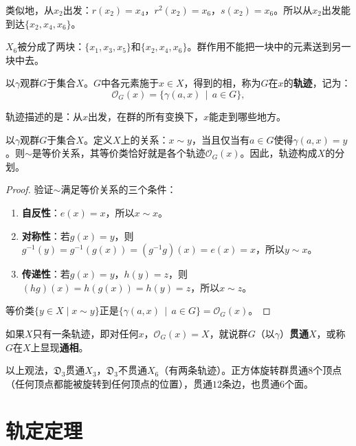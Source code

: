 \documentclass[12pt,UTF8,fontset=none]{ctexbook}
\begin{document}
类似地，从$x_2$出发：$r(x_2) = x_4$，$r^2(x_2) = x_6$，$s(x_2) = x_6$。所以从$x_2$出发能到达$\{x_2, x_4, x_6\}$。

$X_6$被分成了两块：$\{x_1, x_3, x_5\}$和$\{x_2, x_4, x_6\}$。群作用不能把一块中的元素送到另一块中去。


\begin{df}
以$\gamma$观群$G$于集合$X$。$G$中各元素施于$x\in X$，得到的相，称为$G$在$x$的\textbf{轨迹}，记为：
\[
\mathcal{O}_G(x) = \{\gamma(a,x) \,\mid \,a \in G\},
\]
\end{df}

轨迹描述的是：从$x$出发，在群的所有变换下，$x$能走到哪些地方。

\begin{pp}
以$\gamma$观群$G$于集合$X$。定义$X$上的关系：$x \sim y$，当且仅当有$a\in G$使得$\gamma(a,x) = y$。则$\sim$是等价关系，其等价类恰好就是各个轨迹$\mathcal{O}_G(x)$。因此，轨迹构成$X$的分划。
\end{pp}

\begin{proof}
验证$\sim$满足等价关系的三个条件：
\begin{enumerate}
    \item \textbf{自反性}：$e(x) = x$，所以$x \sim x$。
    \item \textbf{对称性}：若$g(x) = y$，则$g^{-1}(y) = g^{-1}(g(x)) = (g^{-1}g)(x) = e(x) = x$，所以$y \sim x$。
    \item \textbf{传递性}：若$g(x) = y$，$h(y) = z$，则$(hg)(x) = h(g(x)) = h(y) = z$，所以$x \sim z$。
\end{enumerate}
等价类$\{y \in X \mid x \sim y\}$正是$\{\gamma(a,x)\, \mid\,a \in G\} = \mathcal{O}_G(x)$。
\end{proof}

如果$X$只有一条轨迹，即对任何$x$，$\mathcal{O}_G(x) = X$，就说群$G$（以$\gamma$）\textbf{贯通}$X$，或称$G$在$X$上显现\textbf{通相}。

\begin{ex}
以上观法，$\mathfrak{D}_3$贯通$X_3$，$\mathfrak{D}_3$不贯通$X_6$（有两条轨迹）。正方体旋转群贯通$8$个顶点（任何顶点都能被旋转到任何顶点的位置），贯通$12$条边，也贯通$6$个面。
\end{ex}

\section{轨定定理}
\end{document}

